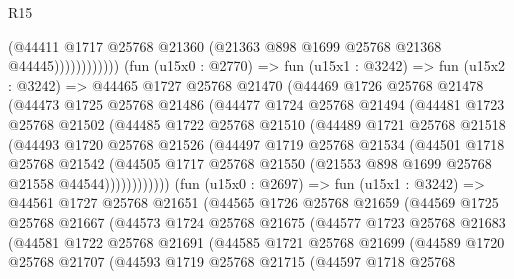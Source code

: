 \begin{lexlean}{R15}
\begin{coremodule}
                            (@44411
                              @1717
                              @25768
                              @21360
                              (@21363 @898 @1699 @25768 @21368 @44445))))))))))))
        (fun (u15x0 : @2770) =>
        fun (u15x1 : @3242) =>
        fun (u15x2 : @3242) =>
        @44465
          @1727
          @25768
          @21470
          (@44469
            @1726
            @25768
            @21478
            (@44473
              @1725
              @25768
              @21486
              (@44477
                @1724
                @25768
                @21494
                (@44481
                  @1723
                  @25768
                  @21502
                  (@44485
                    @1722
                    @25768
                    @21510
                    (@44489
                      @1721
                      @25768
                      @21518
                      (@44493
                        @1720
                        @25768
                        @21526
                        (@44497
                          @1719
                          @25768
                          @21534
                          (@44501
                            @1718
                            @25768
                            @21542
                            (@44505
                              @1717
                              @25768
                              @21550
                              (@21553 @898 @1699 @25768 @21558 @44544))))))))))))
        (fun (u15x0 : @2697) =>
        fun (u15x1 : @3242) =>
        @44561
          @1727
          @25768
          @21651
          (@44565
            @1726
            @25768
            @21659
            (@44569
              @1725
              @25768
              @21667
              (@44573
                @1724
                @25768
                @21675
                (@44577
                  @1723
                  @25768
                  @21683
                  (@44581
                    @1722
                    @25768
                    @21691
                    (@44585
                      @1721
                      @25768
                      @21699
                      (@44589
                        @1720
                        @25768
                        @21707
                        (@44593
                          @1719
                          @25768
                          @21715
                          (@44597
                            @1718
                            @25768

\end{coremodule}
\end{lexlean}
